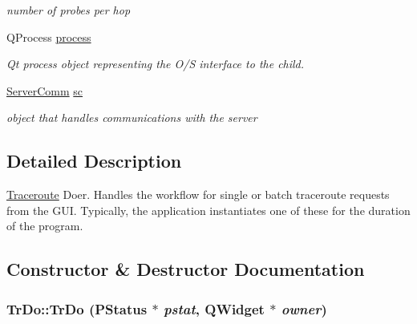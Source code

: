 \begin{CompactItemize}
\begin{CompactList}\small\item\em number of probes per hop \item\end{CompactList}\item 
\hypertarget{classTrDo_dbb1f50609d91d64f24a19b1b1c3d92f}{
QProcess \hyperlink{classTrDo_dbb1f50609d91d64f24a19b1b1c3d92f}{process}}
\label{classTrDo_dbb1f50609d91d64f24a19b1b1c3d92f}

\begin{CompactList}\small\item\em Qt process object representing the O/S interface to the child. \item\end{CompactList}\item 
\hypertarget{classTrDo_712101cfaa278bcfb7c3ca545bd67ff5}{
\hyperlink{classServerComm}{ServerComm} \hyperlink{classTrDo_712101cfaa278bcfb7c3ca545bd67ff5}{sc}}
\label{classTrDo_712101cfaa278bcfb7c3ca545bd67ff5}

\begin{CompactList}\small\item\em object that handles communications with the server \item\end{CompactList}\end{CompactItemize}


\subsection{Detailed Description}
\hyperlink{classTraceroute}{Traceroute} Doer. Handles the workflow for single or batch traceroute requests from the GUI. Typically, the application instantiates one of these for the duration of the program. 

\subsection{Constructor \& Destructor Documentation}
\hypertarget{classTrDo_c8608da0169aba638259ee2b5d8e93c2}{
\subsubsection[TrDo]{\setlength{\rightskip}{0pt plus 5cm}TrDo::TrDo ({\bf PStatus} $\ast$ {\em pstat}, \/  QWidget $\ast$ {\em owner})}}
\label{classTrDo_c8608da0169aba638259ee2b5d8e93c2}


